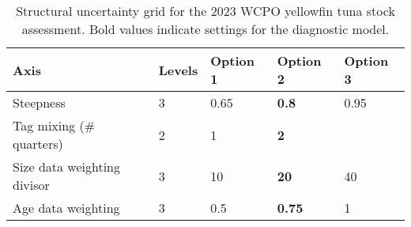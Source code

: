 \clearpage

\begin{table}[t]
  \centering
  \caption{\label{tab:grid_desc} Structural uncertainty grid for the 2023 WCPO yellowfin tuna stock assessment. Bold values indicate settings for the diagnostic model.}
  \small
  \begin{tabular}{lllll}
    \hline
    Axis                        & Levels & Option 1 & Option 2      & Option 3\\
    \hline
    Steepness                   & 3      & 0.65     & \textbf{0.8}  & 0.95    \\
    Tag mixing (\# quarters)    & 2      & 1        & \textbf{2}    &         \\
    Size data weighting divisor & 3      & 10       & \textbf{20}   & 40      \\
    Age data weighting          & 3      & 0.5      & \textbf{0.75} & 1       \\
    \hline
  \end{tabular}
\end{table}

